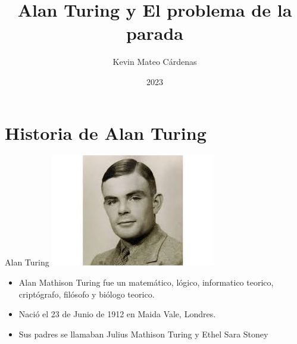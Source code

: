 \documentclass{beamer}
\title{Alan Turing y El problema de la parada}
\author{Kevin Mateo Cárdenas}
\date{2023}
\begin{document}
\maketitle
{}
\section{Historia de Alan Turing}
\begin{frame}{Alan Turing}
\includegraphics[scale=0.7]{turing.png}
\begin{itemize}
    \item Alan Mathison Turing fue un matemático, lógico, informatico teorico, criptógrafo, filósofo y biólogo teorico.\pause
    \item Nació el 23 de Junio de 1912 en Maida Vale, Londres.\pause
    \item Sus padres se llamaban Julius Mathison Turing y Ethel Sara Stoney
\end{itemize}
\end{frame}
\end{document}
